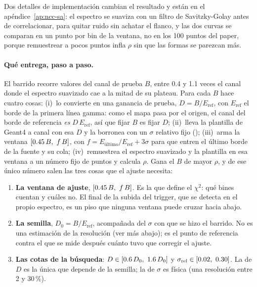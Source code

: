 \documentclass[11pt,a4paper]{article}
\begin{document}
Dos detalles de implementación cambian el resultado y están en el
apéndice~\ref{ap:ncc-sa}: el espectro se suaviza con un filtro de
Savitzky-Golay antes de correlacionar, para quitar ruido sin achatar el
flanco, y las dos curvas se comparan en un punto por bin de la ventana, no
en los 100 puntos del paper, porque remuestrear a pocos puntos infla $\rho$
sin que las formas se parezcan más.

\paragraph{Qué entrega, paso a paso.} El barrido recorre \NBarrido{} valores
del canal de prueba $B$, entre 0.4 y 1.1 veces el canal donde el espectro
suavizado cae a la mitad de su plateau. Para cada $B$ hace cuatro cosas:
(i)~lo convierte en una ganancia de prueba, $D = B/E_{\text{ref}}$, con
$E_{\text{ref}}$ el borde de la primera línea gamma: como el mapa pasa por el
origen, el canal del borde de referencia \emph{es} $D\,E_{\text{ref}}$, así que
fijar $B$ es fijar $D$; (ii)~lleva la plantilla de Geant4 a canal con esa $D$ y
la borronea con un $\sigma$ relativo fijo (\SigmaRelNCC); (iii)~arma la ventana
$[0.45\,B,\ f\,B]$, con $f = E_{\text{último}}/E_{\text{ref}} + 3\sigma$
para que entren el último borde de la fuente y su cola; (iv)~remuestrea el
espectro suavizado y la plantilla en esa ventana a un número fijo de puntos y
calcula $\rho$. Gana el $B$ de mayor $\rho$, y de ese único número salen las
tres cosas que el ajuste necesita:

\begin{enumerate}
\item \textbf{La ventana de ajuste}, $[0.45\,B,\ f\,B]$. Es la que define
      el $\chi^2$: qué bines cuentan y cuáles no. El final de la subida del
      trigger, que se detecta en el propio espectro, es un piso que ninguna
      ventana puede cruzar hacia abajo.
\item \textbf{La semilla}, $D_0 = B/E_{\text{ref}}$, acompañada del $\sigma$
      con que se hizo el barrido. No es una estimación de la resolución (ver
      más abajo); es el punto de referencia contra el que se mide después
      cuánto tuvo que corregir el ajuste.
\item \textbf{Las cotas de la búsqueda}: $D \in [0.6\,D_0,\ 1.6\,D_0]$
      y $\sigma_{\text{rel}} \in [\CotaSigmaMin,\ \CotaSigmaMax]$. La de $D$ es
      la única que depende de la semilla; la de $\sigma$ es física (una
      resolución entre 2 y 30\,\%).
\end{enumerate}
\end{document}
